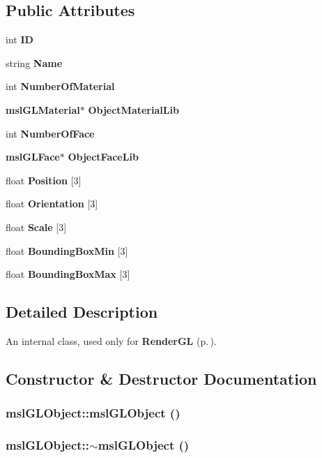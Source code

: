 \subsection*{Public Attributes}
\begin{CompactItemize}
\item 
int {\bf ID}
\item 
string {\bf Name}
\item 
int {\bf Number\-Of\-Material}
\item 
{\bf msl\-GLMaterial}$\ast$ {\bf Object\-Material\-Lib}
\item 
int {\bf Number\-Of\-Face}
\item 
{\bf msl\-GLFace}$\ast$ {\bf Object\-Face\-Lib}
\item 
float {\bf Position} [3]
\item 
float {\bf Orientation} [3]
\item 
float {\bf Scale} [3]
\item 
float {\bf Bounding\-Box\-Min} [3]
\item 
float {\bf Bounding\-Box\-Max} [3]
\end{CompactItemize}


\subsection{Detailed Description}
An internal class, used only for {\bf Render\-GL} {\rm (p.\,\pageref{classRenderGL})}.



\subsection{Constructor \& Destructor Documentation}
\subsubsection{\setlength{\rightskip}{0pt plus 5cm}msl\-GLObject::msl\-GLObject ()}\label{classmslGLObject_a0}


\subsubsection{\setlength{\rightskip}{0pt plus 5cm}msl\-GLObject::$\sim$msl\-GLObject ()}\label{classmslGLObject_a1}




